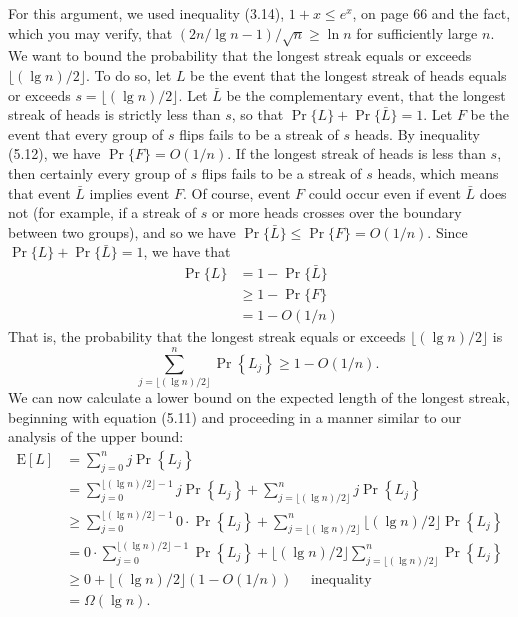 \documentclass[lang=cn,newtx,10pt,scheme=chinese]{elegantbook}
\begin{document}
For this argument, we used inequality (3.14), $1+x \leq e^x$, on page 66 and the fact, which you may verify, that $(2 n / \lg n-1) / \sqrt{n} \geq \ln n$ for sufficiently large $n$.
We want to bound the probability that the longest streak equals or exceeds $\lfloor(\lg n) / 2\rfloor$. To do so, let $L$ be the event that the longest streak of heads equals or exceeds $s=\lfloor(\lg n) / 2\rfloor$. Let $\bar{L}$ be the complementary event, that the longest streak of heads is strictly less than $s$, so that $\operatorname{Pr}\{L\}+\operatorname{Pr}\{\bar{L}\}=1$. Let $F$ be the event that every group of $s$ flips fails to be a streak of $s$ heads. By inequality (5.12), we have $\operatorname{Pr}\{F\}=O(1 / n)$. If the longest streak of heads is less than $s$, then certainly every group of $s$ flips fails to be a streak of $s$ heads, which means that event $\bar{L}$ implies event $F$. Of course, event $F$ could occur even if event $\bar{L}$ does not (for example, if a streak of $s$ or more heads crosses over the boundary between two groups), and so we have $\operatorname{Pr}\{\bar{L}\} \leq \operatorname{Pr}\{F\}=O(1 / n)$. Since $\operatorname{Pr}\{L\}+\operatorname{Pr}\{\bar{L}\}=1$, we have that
$$
\begin{aligned}
\operatorname{Pr}\{L\} & =1-\operatorname{Pr}\{\bar{L}\} \\
& \geq 1-\operatorname{Pr}\{F\} \\
& =1-O(1 / n)
\end{aligned}
$$
That is, the probability that the longest streak equals or exceeds $\lfloor(\lg n) / 2\rfloor$ is
$$
\sum_{j=\lfloor(\lg n) / 2\rfloor}^n \operatorname{Pr}\left\{L_j\right\} \geq 1-O(1 / n) \text {. }
$$
We can now calculate a lower bound on the expected length of the longest streak, beginning with equation (5.11) and proceeding in a manner similar to our analysis of the upper bound:
$$
\begin{aligned}
\mathrm{E}[L] & =\sum_{j=0}^n j \operatorname{Pr}\left\{L_j\right\} \\
& =\sum_{j=0}^{\lfloor(\lg n) / 2\rfloor-1} j \operatorname{Pr}\left\{L_j\right\}+\sum_{j=\lfloor(\lg n) / 2\rfloor}^n j \operatorname{Pr}\left\{L_j\right\} \\
& \geq \sum_{j=0}^{\lfloor(\lg n) / 2\rfloor-1} 0 \cdot \operatorname{Pr}\left\{L_j\right\}+\sum_{j=\lfloor(\lg n) / 2\rfloor}^n\lfloor(\lg n) / 2\rfloor \operatorname{Pr}\left\{L_j\right\} \\
& =0 \cdot \sum_{j=0}^{\lfloor(\lg n) / 2\rfloor-1} \operatorname{Pr}\left\{L_j\right\}+\lfloor(\lg n) / 2\rfloor \sum_{j=\lfloor(\lg n) / 2\rfloor}^n \operatorname{Pr}\left\{L_j\right\} \\
& \geq 0+\lfloor(\lg n) / 2\rfloor(1-O(1 / n)) \quad \text { inequality } \\
& =\Omega(\lg n) .
\end{aligned}
$$
\end{document}
